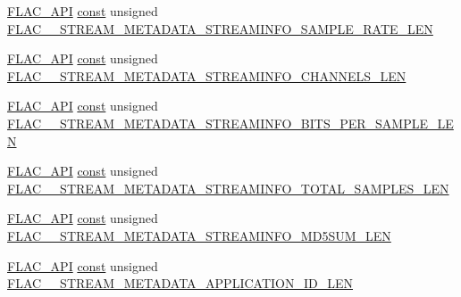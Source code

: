 \begin{DoxyCompactItemize}
\item 
\hyperlink{group__flac__export_ga56ca07df8a23310707732b1c0007d6f5}{F\+L\+A\+C\+\_\+\+A\+PI} \hyperlink{zconf_8h_a2c212835823e3c54a8ab6d95c652660e}{const} unsigned \hyperlink{group__flac__format_gad0d8c637c666ef08cad2d9668f3e9ecf}{F\+L\+A\+C\+\_\+\+\_\+\+S\+T\+R\+E\+A\+M\+\_\+\+M\+E\+T\+A\+D\+A\+T\+A\+\_\+\+S\+T\+R\+E\+A\+M\+I\+N\+F\+O\+\_\+\+S\+A\+M\+P\+L\+E\+\_\+\+R\+A\+T\+E\+\_\+\+L\+EN}
\item 
\hyperlink{group__flac__export_ga56ca07df8a23310707732b1c0007d6f5}{F\+L\+A\+C\+\_\+\+A\+PI} \hyperlink{zconf_8h_a2c212835823e3c54a8ab6d95c652660e}{const} unsigned \hyperlink{group__flac__format_gadc990fec49da063c33debfc2817c0e98}{F\+L\+A\+C\+\_\+\+\_\+\+S\+T\+R\+E\+A\+M\+\_\+\+M\+E\+T\+A\+D\+A\+T\+A\+\_\+\+S\+T\+R\+E\+A\+M\+I\+N\+F\+O\+\_\+\+C\+H\+A\+N\+N\+E\+L\+S\+\_\+\+L\+EN}
\item 
\hyperlink{group__flac__export_ga56ca07df8a23310707732b1c0007d6f5}{F\+L\+A\+C\+\_\+\+A\+PI} \hyperlink{zconf_8h_a2c212835823e3c54a8ab6d95c652660e}{const} unsigned \hyperlink{group__flac__format_ga84c55a68f58fff56e23fda6d24bd3510}{F\+L\+A\+C\+\_\+\+\_\+\+S\+T\+R\+E\+A\+M\+\_\+\+M\+E\+T\+A\+D\+A\+T\+A\+\_\+\+S\+T\+R\+E\+A\+M\+I\+N\+F\+O\+\_\+\+B\+I\+T\+S\+\_\+\+P\+E\+R\+\_\+\+S\+A\+M\+P\+L\+E\+\_\+\+L\+EN}
\item 
\hyperlink{group__flac__export_ga56ca07df8a23310707732b1c0007d6f5}{F\+L\+A\+C\+\_\+\+A\+PI} \hyperlink{zconf_8h_a2c212835823e3c54a8ab6d95c652660e}{const} unsigned \hyperlink{group__flac__format_ga061dcc54018329ac1b893d95b3970ebc}{F\+L\+A\+C\+\_\+\+\_\+\+S\+T\+R\+E\+A\+M\+\_\+\+M\+E\+T\+A\+D\+A\+T\+A\+\_\+\+S\+T\+R\+E\+A\+M\+I\+N\+F\+O\+\_\+\+T\+O\+T\+A\+L\+\_\+\+S\+A\+M\+P\+L\+E\+S\+\_\+\+L\+EN}
\item 
\hyperlink{group__flac__export_ga56ca07df8a23310707732b1c0007d6f5}{F\+L\+A\+C\+\_\+\+A\+PI} \hyperlink{zconf_8h_a2c212835823e3c54a8ab6d95c652660e}{const} unsigned \hyperlink{group__flac__format_ga35030375a8c77a3799bceea07f95b221}{F\+L\+A\+C\+\_\+\+\_\+\+S\+T\+R\+E\+A\+M\+\_\+\+M\+E\+T\+A\+D\+A\+T\+A\+\_\+\+S\+T\+R\+E\+A\+M\+I\+N\+F\+O\+\_\+\+M\+D5\+S\+U\+M\+\_\+\+L\+EN}
\item 
\hyperlink{group__flac__export_ga56ca07df8a23310707732b1c0007d6f5}{F\+L\+A\+C\+\_\+\+A\+PI} \hyperlink{zconf_8h_a2c212835823e3c54a8ab6d95c652660e}{const} unsigned \hyperlink{group__flac__format_ga8a1d1839a9e22692dfeaf9fce9cb9991}{F\+L\+A\+C\+\_\+\+\_\+\+S\+T\+R\+E\+A\+M\+\_\+\+M\+E\+T\+A\+D\+A\+T\+A\+\_\+\+A\+P\+P\+L\+I\+C\+A\+T\+I\+O\+N\+\_\+\+I\+D\+\_\+\+L\+EN}

\end{DoxyCompactItemize}
